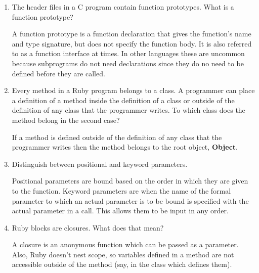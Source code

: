 \begin{enumerate}
  \item The header files in a C program contain function
    prototypes. What is a function prototype?

\begin{answer}

    A function prototype is a function declaration that gives the function's name and type signature, but does not specify the function body. It is also referred to as a function interface at times. In other languages these are uncommon because subprograms do not need declarations since they do no need to be defined before they are called. 
    
\end{answer}


  \item Every method in a Ruby program belongs to a class.
    A programmer can place a definition of a method inside
    the definition of a class or outside of the definition
    of any class that the programmer writes. To which class
    does the method belong in the second case?
 
 \begin{answer}
 
    If a method is defined outside of the definition of any class that the programmer writes then the method belongs to the root object, \textbf{Object}. 
    
\end{answer}

  \item Distinguish between positional and keyword parameters.
  
\begin{answer}

  Positional parameters are bound based on the order in which they are given to the function. Keyword parameters are when the name of the formal parameter to which an actual parameter is to be bound is specified with the actual parameter in a call. This allows them to be input in any order.
  
\end{answer}


  \item Ruby blocks are closures. What does that mean?
  
\begin{answer}

  A closure is an anonymous function which can be passed as a parameter. Also, Ruby doesn't nest scope, so variables defined in a method are not accessible outside of the method (say, in the class which defines them).
  

\end{answer}
\end{enumerate}
